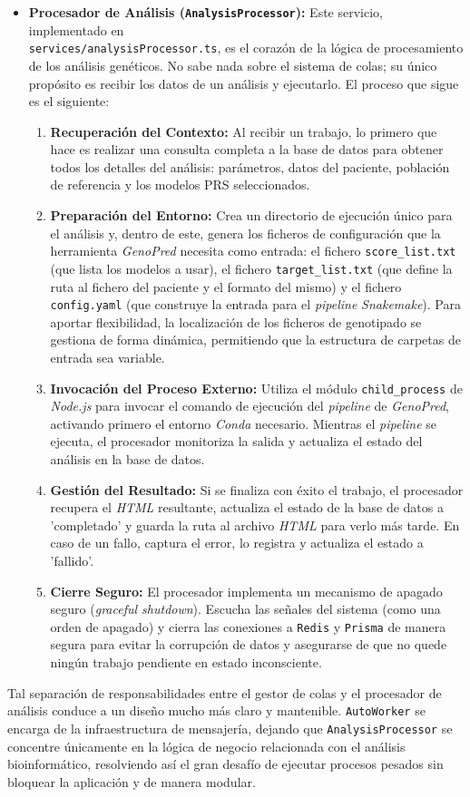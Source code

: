 \begin{itemize}
\item \textbf{Procesador de Análisis (\texttt{AnalysisProcessor}):}
Este servicio, implementado en \\ \texttt{services/analysisProcessor.ts}, es el corazón de la lógica de procesamiento de los análisis genéticos. No sabe nada sobre el sistema de colas; su único propósito es recibir los datos de un análisis y ejecutarlo. El proceso que sigue es el siguiente:
\begin{enumerate}
    \item \textbf{Recuperación del Contexto:} Al recibir un trabajo, lo primero que hace es realizar una consulta completa a la base de datos para obtener todos los detalles del análisis: parámetros, datos del paciente, población de referencia y los modelos PRS seleccionados.
    \item \textbf{Preparación del Entorno:} Crea un directorio de ejecución único para el análisis y, dentro de este, genera los ficheros de configuración que la herramienta \textit{GenoPred} necesita como entrada: el fichero \texttt{score\_list.txt} (que lista los modelos a usar), el fichero \texttt{target\_list.txt} (que define la ruta al fichero del paciente y el formato del mismo) y el fichero \texttt{config.yaml} (que construye la entrada para el \textit{pipeline} \textit{Snakemake}). Para aportar flexibilidad, la localización de los ficheros de genotipado se gestiona de forma dinámica, permitiendo que la estructura de carpetas de entrada sea variable.
    \item \textbf{Invocación del Proceso Externo:} Utiliza el módulo \texttt{child\_process} de \textit{Node.js} para invocar el comando de ejecución del \textit{pipeline} de \textit{GenoPred}, activando primero el entorno \textit{Conda} necesario. Mientras el \textit{pipeline} se ejecuta, el procesador monitoriza la salida y actualiza el estado del análisis en la base de datos.
    \item \textbf{Gestión del Resultado:} Si se finaliza con éxito el trabajo, el procesador recupera el \textit{HTML} resultante, actualiza el estado de la base de datos a 'completado' y guarda la ruta al archivo \textit{HTML} para verlo más tarde.  En caso de un fallo, captura el error, lo registra y actualiza el estado a 'fallido'.
    \item \textbf{Cierre Seguro:} El procesador implementa un mecanismo de apagado seguro (\textit{graceful shutdown}).  Escucha las señales del sistema (como una orden de apagado) y cierra las conexiones a \texttt{Redis} y \texttt{Prisma} de manera segura para evitar la corrupción de datos y asegurarse de que no quede ningún trabajo pendiente en estado inconsciente.
\end{enumerate}
\end{itemize}
Tal separación de responsabilidades entre el gestor de colas y el procesador de análisis conduce a un diseño mucho más claro y mantenible. \texttt{AutoWorker} se encarga de la infraestructura de mensajería, dejando que \texttt{AnalysisProcessor} se concentre únicamente en la lógica de negocio relacionada con el análisis bioinformático, resolviendo así el gran desafío de ejecutar procesos pesados sin bloquear la aplicación y de manera modular.

